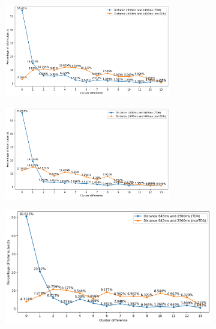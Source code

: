 \begin{figure}[!ht]
	\centering
	\begin{subfigure}[!ht]{1\linewidth}
		\centering
		\hspace{8mm}
		\includegraphics[width=0.8\textwidth, height=0.28\textheight]{figures/pairwise_2500_1400.png}\hfill
	\end{subfigure}
	\begin{subfigure}[!ht]{1\linewidth}
		\centering
		\hspace{8mm}
		\includegraphics[width=0.8\textwidth, height=0.28\textheight]{figures/pairwise_1400_645.png}\hfill
	\end{subfigure}
	\begin{subfigure}[!ht]{0.8\linewidth}
		\centering
		\hspace{8mm}
		\includegraphics[width=1\textwidth, height=0.28\textheight]{figures/pairwise_645_2500.png}\hfill

\end{subfigure}
\end{figure}
